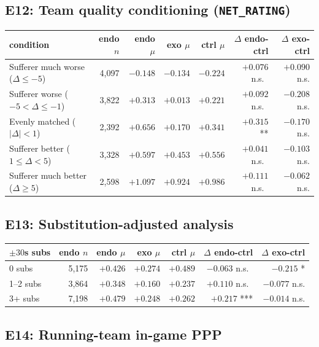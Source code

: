 \documentclass[twoside,11pt]{article}
\begin{document}
\subsection*{E12: Team quality conditioning (\texttt{NET\_RATING})}

\begin{tabular}{lrrrrrr}
		\toprule
		condition & endo $n$ & endo $\mu$ & exo $\mu$ & ctrl $\mu$ & $\Delta$ endo-ctrl & $\Delta$ exo-ctrl \\
		\midrule
		Sufferer much worse ($\Delta \leq -5$)  & 4{,}097 & $-0.148$ & $-0.134$ & $-0.224$ & $+0.076$ n.s.\ & $+0.090$ n.s. \\
		Sufferer worse ($-5 < \Delta \leq -1$)  & 3{,}822 & $+0.313$ & $+0.013$ & $+0.221$ & $+0.092$ n.s.\ & $-0.208$ n.s. \\
		Evenly matched ($|\Delta| < 1$)         & 2{,}392 & $+0.656$ & $+0.170$ & $+0.341$ & $+0.315$ **    & $-0.170$ n.s. \\
		Sufferer better ($1 \leq \Delta < 5$)   & 3{,}328 & $+0.597$ & $+0.453$ & $+0.556$ & $+0.041$ n.s.\ & $-0.103$ n.s. \\
		Sufferer much better ($\Delta \geq 5$)  & 2{,}598 & $+1.097$ & $+0.924$ & $+0.986$ & $+0.111$ n.s.\ & $-0.062$ n.s. \\
		\bottomrule
\end{tabular}

\subsection*{E13: Substitution-adjusted analysis}

\begin{tabular}{lrrrrrr}
		\toprule
		$\pm 30$s subs & endo $n$ & endo $\mu$ & exo $\mu$ & ctrl $\mu$ & $\Delta$ endo-ctrl & $\Delta$ exo-ctrl \\
		\midrule
		0 subs   & 5{,}175 & $+0.426$ & $+0.274$ & $+0.489$ & $-0.063$ n.s.\ & $-0.215$ *    \\
		1--2 subs & 3{,}864 & $+0.348$ & $+0.160$ & $+0.237$ & $+0.110$ n.s.\ & $-0.077$ n.s. \\
		3+ subs   & 7{,}198 & $+0.479$ & $+0.248$ & $+0.262$ & $+0.217$ ***   & $-0.014$ n.s. \\
		\bottomrule
\end{tabular}

\subsection*{E14: Running-team in-game PPP}
\end{document}
